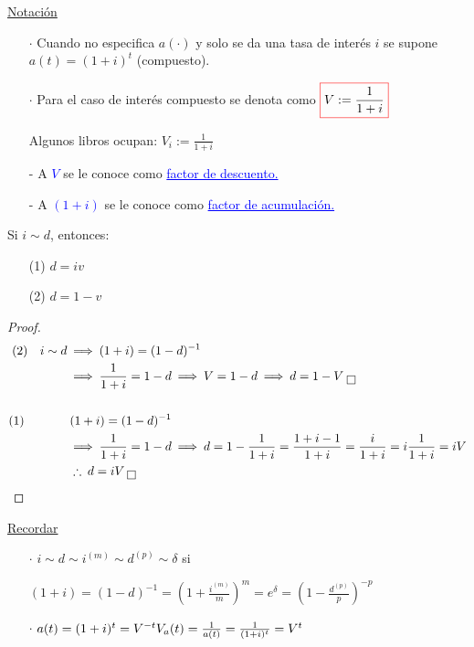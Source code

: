 \uline{Notación}
\begin{itemize}
\item[$\cdot$] Cuando no especifica $a(\cdot)$ y solo se da una tasa de interés $i$ se supone $a(t) = (1+i)^t$ (compuesto).
\item[$\cdot$] Para el caso de interés compuesto se denota como $\color{red}\boxed{\color{black} V:= \frac{1}{1+i}}$

Algunos libros ocupan: $V_i := \frac{1}{1+i}$

\item[-] A \textcolor{blue}{\uline{$V$}} se le conoce como \textcolor{blue}{\uline{factor de descuento.}}

\item[-]A \textcolor{blue}{\uline{$(1+i)$}} se le conoce como \textcolor{blue}{\uline{factor de acumulación.}}
\end{itemize}

\begin{proposition}
Si $i\sim d$, entonces:
\begin{enumerate}
\item[(1)] \ul{$d = iv$}
\item[(2)] \ul{$d = 1-v$}
\end{enumerate}
\end{proposition}
\begin{proof}
\begin{align*}
(2) \quad i\sim d \: &\Longrightarrow \: (1+i) = (1-d)^{-1} \\
& \Longrightarrow \: \frac{1}{1+i} = 1-d \: \Longrightarrow \: V = 1-d \: \Longrightarrow \: d=1-V \; \boxed{}\\
&\hfill \\
(1) \hspace{1.3cm} &(1+i) = (1-d)^{-1} \\
& \Longrightarrow \: \frac{1}{1+i} = 1-d \: \Longrightarrow \: d = 1 - \frac{1}{1+i} = \frac{1+i-1}{1+i} = \frac{i}{1+i} = i\frac{1}{1+i} = iV\\
& \therefore \: d=iV \: \boxed{}
\end{align*}
\end{proof}
\uline{Recordar}
\begin{itemize}
\item[$\cdot$] $i\sim d \sim i^{(m)} \sim d^{(p)} \sim \delta$ si 

$(1+i) = (1-d)^{-1} = \left(1+ \frac{i^{(m)}}{m} \right)^m = e^{\delta} = \left(1 - \frac{d^{(p)}}{p} \right)^{-p}$
\item[$\cdot$] $a(t) = (1+i)^t = V^{-t}\\
V_a(t) = \frac{1}{a(t)} = \frac{1}{(1+i)^t} = V^t$
\end{itemize}

